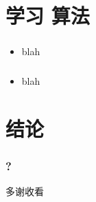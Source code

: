 \documentclass[17pt]{beamer}
\newcommand\Wider[2][3em]{%
	\makebox[\linewidth][c]{%
		\begin{minipage}{\dimexpr\textwidth+#1\relax}
			\raggedright#2
		\end{minipage}%
}%
}
\begin{document}
\section[Section]{学习 算法}
\frame{\sectionpage}

\begin{frame}
\frametitle{}
\begin{itemize}
	\item blah
\end{itemize}
\end{frame}

\begin{frame}
\frametitle{}
\begin{itemize}
	\item blah
\end{itemize}
\end{frame}

\section*{结论}

\begin{frame}
\frametitle{?}
\Wider[1em]{
\begin{itemize}
	\item
\end{itemize}
}
	\begin{center}
		多谢收看 \smiley{}
	\end{center}
\end{frame}

\end{document}
